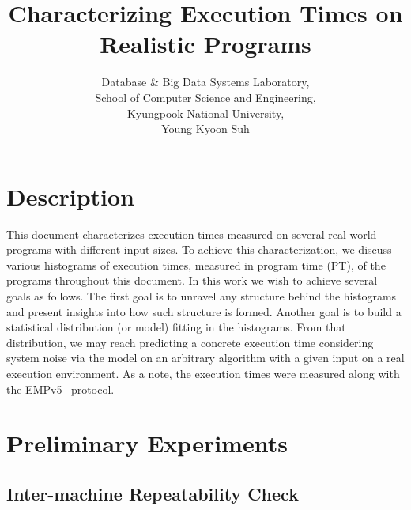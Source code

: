 \documentclass[10pt]{article}
\begin{document}
\title{Characterizing Execution Times on Realistic Programs}

\author{
Database \& Big Data Systems Laboratory,\\
School of Computer Science and Engineering, \\
Kyungpook National University,\\
Young-Kyoon Suh\\
}
\maketitle

\section{Description}
This document characterizes execution times 
measured on several real-world programs with different input sizes. 
To achieve this characterization, we discuss 
various histograms of execution times, measured in program time (PT), of the programs throughout this document. 
In this work we wish to achieve several goals as follows. 
The first goal is to unravel any structure behind the histograms and present insights into how such structure is formed. 
Another goal is to build a statistical distribution (or model) fitting in the histograms. 
From that distribution, we may reach predicting a concrete execution time considering system noise via 
the model on an arbitrary algorithm with a given input on a real execution environment. 
As a note, the execution times were measured along with the EMPv5~\cite{EMP} protocol. 

\section{Preliminary Experiments}

\subsection{Inter-machine Repeatability Check~\label{sec:diff_machine}} 
\end{document}
